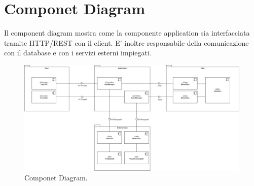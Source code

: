 \section{Componet Diagram} 
Il component diagram mostra come la componente application sia interfacciata tramite HTTP/REST con il client. E' inoltre responsabile 
della comunicazione con il database e con i servizi esterni impiegati.
\begin{figure}[h!]
	\centering
	\includegraphics[width=0.8\linewidth]{diagrammi/Component.drawio.png}
	\caption{Componet Diagram.}
	\label{fig:ComponentDiagram}
\end{figure}
